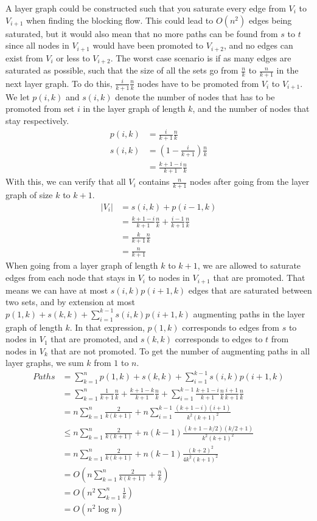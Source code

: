 A layer graph could be constructed such that you saturate every edge from $V_i$ to $V_{i+1}$ when finding the blocking flow.
This could lead to $O(n^2)$ edges being saturated, but it would also mean that no more paths can be found from $s$ to $t$ 
since all nodes in $V_{i+1}$ would have been promoted to $V_{i+2}$, and no edges can exist from $V_i$ or less to $V_{i+2}$.
The worst case scenario is if as many edges are saturated as possible, such that the size of all the sets go from $\frac{n}{k}$ to $\frac{n}{k+1}$ in the next layer graph.
To do this, $\frac{i}{k+1}\frac{n}{k}$ nodes have to be promoted from $V_i$ to $V_{i+1}$.
We let $p(i, k)$ and $s(i, k)$ denote the number of nodes that has to be promoted from set $i$ in the layer graph of length $k$, and the number of nodes that stay respectively.
\begin{align*}
p(i, k) &= \frac{i}{k+1}\frac{n}{k}\\
s(i, k) &= \left(1 - \frac{i}{k+1}\right)\frac{n}{k}\\
 &= \frac{k+1-i}{k+1}\frac{n}{k}
\end{align*}
With this, we can verify that all $V_i$ contains $\frac{n}{k+1}$ nodes after going from the layer graph of size $k$ to $k+1$.
\begin{align*}
|V_i|&=s(i, k)+p(i-1, k)\\
&=\frac{k+1-i}{k+1}\frac{n}{k}+\frac{i-1}{k+1}\frac{n}{k}\\
&=\frac{k}{k+1}\frac{n}{k}\\
&=\frac{n}{k+1}
\end{align*}
When going from a layer graph of length $k$ to $k+1$, we are allowed to saturate edges from each node that stays in $V_i$ to nodes in $V_{i+1}$ that are promoted.
That means we can have at most $s(i, k)p(i+1, k)$ edges that are saturated between two sets, and by extension at most $p(1, k)+s(k, k)+\sum_{i=1}^{k-1}{s(i, k)p(i+1, k)}$ 
augmenting paths in the layer graph of length $k$. In that expression, $p(1, k)$ corresponds to edges from $s$ to nodes in $V_1$ that are promoted, 
and $s(k, k)$ corresponds to edges to $t$ from nodes in $V_k$ that are not promoted.
To get the number of augmenting paths in all layer graphs, we sum $k$ from $1$ to $n$.
\begin{align*}
Paths&=\sum_{k=1}^{n}{p(1, k)+s(k, k)+\sum_{i=1}^{k-1}{s(i, k)p(i+1, k)}}\\
&=\sum_{k=1}^{n}{\frac{1}{k+1}\frac{n}{k}+\frac{k+1-k}{k+1}\frac{n}{k}+\sum_{i=1}^{k-1}{\frac{k+1-i}{k+1}\frac{n}{k}\frac{i+1}{k+1}\frac{n}{k}}}\\
&=n\sum_{k=1}^{n}{\frac{2}{k(k+1)}+n\sum_{i=1}^{k-1}{\frac{(k+1-i)(i+1)}{k^2(k+1)^2}}}\\
&\leq n\sum_{k=1}^{n}{\frac{2}{k(k+1)}+n(k-1)\frac{(k+1-k/2)(k/2+1)}{k^2(k+1)^2}}\\
&=n\sum_{k=1}^{n}{\frac{2}{k(k+1)}+n(k-1)\frac{(k+2)^2}{4k^2(k+1)^2}}\\
&=O\left( n\sum_{k=1}^{n}{\frac{2}{k(k+1)}+\frac{n}{k}}\right)\\
&=O\left( n^2\sum_{k=1}^{n}{\frac{1}{k}}\right)\\
&= O\left(n^2\log n\right)
\end{align*}
